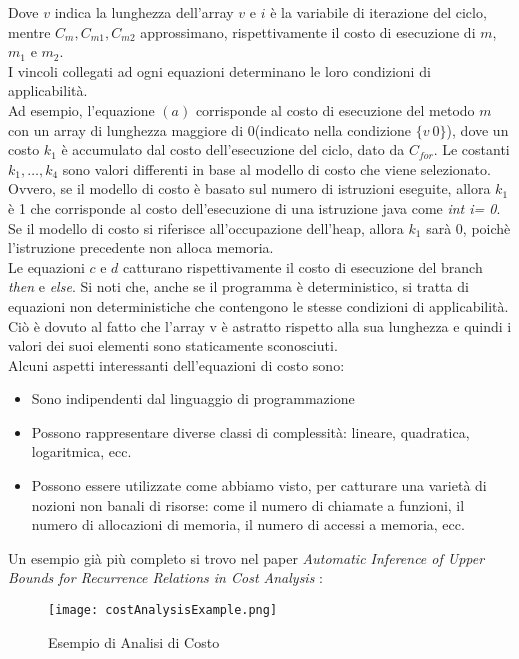 \documentclass[../../main.tex]{subfiles}
\begin{document}
Dove $v$ indica la lunghezza dell'array $v$ e $i$ è la variabile di iterazione del ciclo, mentre $C_m,C_{m1},C_{m2}$ approssimano, rispettivamente il costo di esecuzione di $m$, $m_1$ e $m_2$.\\
I vincoli collegati ad ogni equazioni determinano le loro condizioni di applicabilità.\\
Ad esempio, l'equazione $(a)$ corrisponde al costo di esecuzione del metodo $m$ con un array di lunghezza maggiore di 0(indicato nella condizione $\{v \> 0\}$), dove un costo $k_1$ è accumulato dal costo dell'esecuzione del ciclo, dato da $C_{for}$.
Le costanti $k_1,\dots,k_4$ sono valori differenti in base al modello di costo che viene selezionato.
Ovvero, se il modello di costo è basato sul numero di istruzioni eseguite, allora $k_1$ è 1 che corrisponde al costo dell'esecuzione di una istruzione java come \textit{int i= 0}.
Se il modello di costo si riferisce all'occupazione dell'heap, allora $k_1$ sarà 0, poichè l'istruzione precedente non alloca memoria.\\
Le equazioni $c$ e $d$ catturano rispettivamente il costo di esecuzione del branch \textit{then} e \textit{else}.
Si noti che, anche se il programma è deterministico, si tratta di equazioni non deterministiche che contengono le stesse condizioni di applicabilità. Ciò è dovuto al fatto che l'array v è astratto rispetto alla sua lunghezza e quindi i valori dei suoi elementi sono staticamente sconosciuti.\\
Alcuni aspetti interessanti dell'equazioni di costo sono:
\begin{itemize}
    \item Sono indipendenti dal linguaggio di programmazione
    \item Possono rappresentare diverse classi di complessità: lineare, quadratica, logaritmica, ecc.
    \item Possono essere utilizzate come abbiamo visto, per catturare una varietà di nozioni non banali di risorse: come il numero di chiamate a funzioni, il numero di allocazioni di memoria, il numero di accessi a memoria, ecc.
\end{itemize}
Un esempio già più completo si trovo nel paper \textit{Automatic Inference of Upper Bounds for Recurrence Relations in Cost Analysis} \autocite{albert2008automatic}:
\begin{figure}[H]
    \centering
    \texttt{[image: costAnalysisExample.png]}
    \caption{Esempio di Analisi di Costo}
    \label{fig:costAnalysisExample}
\end{figure}
\end{document}
